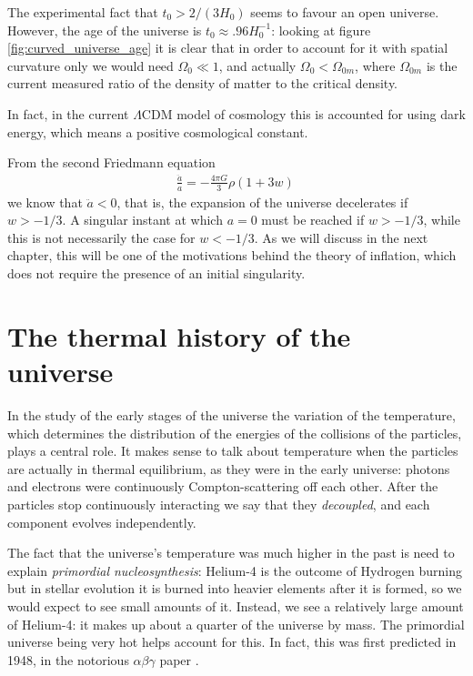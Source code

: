 \documentclass[main.tex]{subfiles}
\begin{document}
The experimental fact that \(t_0 > 2/(3H_0 )\) seems to favour an open universe. 
However, the age of the universe is \(t_0 \approx \num{.96} H_0^{-1}\): looking at figure \ref{fig:curved_universe_age} it is clear that in order to account for it with spatial curvature only we would need \(\Omega_0 \ll 1\), and actually \(\Omega_0 < \Omega_{0m}\), where \(\Omega_{0m}\) is the current measured ratio of the density of matter to the critical density. 

In fact, in the current \(\Lambda \)CDM model of cosmology this is accounted for using dark energy, which means a positive cosmological constant.

From the second Friedmann equation 
%
\begin{align}
\frac{\ddot{a}}{a} =- \frac{4 \pi G}{3} \rho (1+3w) 
\,
\end{align}
%
we know that \(\ddot{a} < 0\), that is, the expansion of the universe decelerates if \(w > - 1/3\).
A singular instant at which \(a =0\) must be reached if \(w>-1/3\), while this is not necessarily the case for \(w<-1/3\).
As we will discuss in the next chapter, this will be one of the motivations behind the theory of inflation, which does not require the presence of an initial singularity. 


\chapter{The thermal history of the universe}

In the study of the early stages of the universe the variation of the temperature, which determines the distribution of the energies of the collisions of the particles, plays a central role.
It makes sense to talk about temperature when the particles are actually in thermal equilibrium, as they were in the early universe: photons and electrons were continuously Compton-scattering off each other. 
After the particles stop continuously interacting we say that they \emph{decoupled}, and each component evolves independently. 

The fact that the universe's temperature was much higher in the past is need to explain \emph{primordial nucleosynthesis}: Helium-4 is the outcome of Hydrogen burning but in stellar evolution it is burned into heavier elements after it is formed, so we would expect to see small amounts of it. 
Instead, we see a relatively large amount of Helium-4: it makes up about a quarter of the universe by mass. 
The primordial universe being very hot helps account for this. 
In fact, this was first predicted in 1948, in the notorious \(\alpha \beta \gamma \) paper \cite[]{alpherOriginChemicalElements1948}. 
\end{document}
